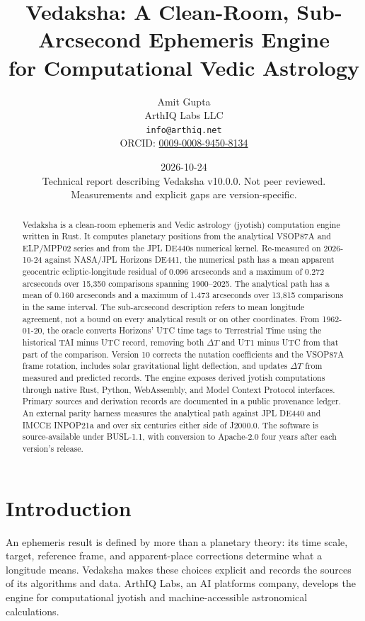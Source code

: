 \documentclass[11pt]{article}
\title{Vedaksha: A Clean-Room, Sub-Arcsecond Ephemeris Engine \\ for Computational Vedic Astrology}
\author{Amit Gupta \\ ArthIQ Labs LLC \\ \texttt{info@arthiq.net} \\ ORCID: \href{https://orcid.org/0009-0008-9450-8134}{0009-0008-9450-8134}}
\date{2026-10-24 \\[0.4em]
\normalsize Technical report describing Vedaksha v10.0.0. Not peer reviewed. \\
\normalsize Measurements and explicit gaps are version-specific.}
\begin{document}
\maketitle

\begin{abstract}
Vedaksha is a clean-room ephemeris and Vedic astrology (jyotish) computation engine written
in Rust. It computes planetary positions from the analytical VSOP87A and ELP/MPP02 series
and from the JPL DE440s numerical kernel. Re-measured on 2026-10-24 against NASA/JPL
Horizons DE441, the numerical path has a mean apparent geocentric ecliptic-longitude
residual of 0.096 arcseconds and a maximum of 0.272 arcseconds over
15,350 comparisons spanning 1900--2025. The analytical path has a mean of 0.160 arcseconds
and a maximum of 1.473 arcseconds over 13,815 comparisons in the same interval.
The sub-arcsecond description refers to mean longitude agreement, not a bound on every
analytical result or on other coordinates. From 1962-01-20, the oracle converts Horizons'
UTC time tags to Terrestrial Time using the historical TAI minus UTC record, removing
both $\Delta T$ and UT1 minus UTC from that part of the comparison.
Version 10 corrects the nutation coefficients and the VSOP87A frame rotation, includes
solar gravitational light deflection, and updates $\Delta T$ from measured and predicted
records. The engine exposes derived jyotish computations through native Rust, Python,
WebAssembly, and Model Context Protocol interfaces. Primary sources and derivation records
are documented in a public provenance ledger. An external parity harness measures the
analytical path against JPL DE440 and IMCCE INPOP21a and over six centuries either side
of J2000.0.
The software is source-available under BUSL-1.1, with conversion to Apache-2.0 four years
after each version's release.
\end{abstract}

\section{Introduction}

An ephemeris result is defined by more than a planetary theory: its time scale, target,
reference frame, and apparent-place corrections determine what a longitude means.
Vedaksha makes these choices explicit and records the sources of its algorithms and data.
ArthIQ Labs, an AI platforms company, develops the engine for computational jyotish
and machine-accessible astronomical calculations.
\end{document}
